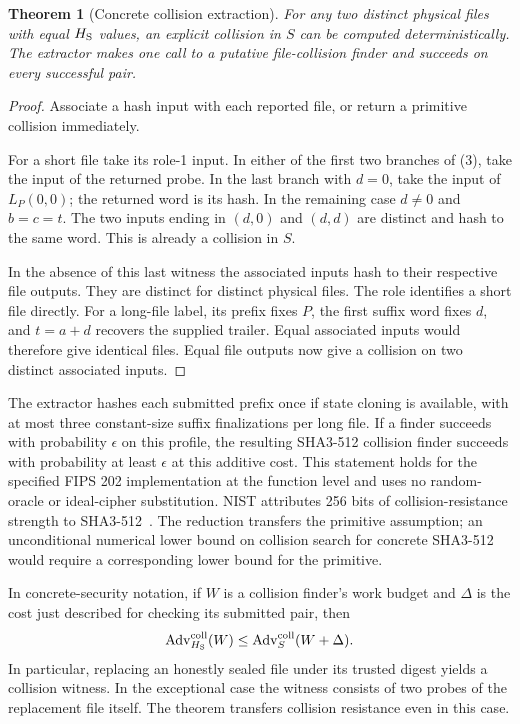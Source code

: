 \documentclass[10pt,twocolumn,letterpaper]{article}
\newtheorem{theorem}{Theorem}
\begin{document}
\begin{theorem}[Concrete collision extraction]\label{th:concrete}
For any two distinct physical files with equal \(H_{\rm S}\) values, an explicit collision in \(S\) can be computed deterministically. The extractor makes one call to a putative file-collision finder and succeeds on every successful pair.
\end{theorem}
\begin{proof}
Associate a hash input with each reported file, or return a primitive collision immediately.

For a short file take its role-1 input. In either of the first two branches of (3), take the input of the returned probe. In the last branch with \(d=0\), take the input of \(L_P(0,0)\); the returned word is its hash. In the remaining case \(d\ne0\) and \(b=c=t\). The two inputs ending in \((d,0)\) and \((d,d)\) are distinct and hash to the same word. This is already a collision in \(S\).

In the absence of this last witness the associated inputs hash to their respective file outputs. They are distinct for distinct physical files. The role identifies a short file directly. For a long-file label, its prefix fixes \(P\), the first suffix word fixes \(d\), and \(t=a+d\) recovers the supplied trailer. Equal associated inputs would therefore give identical files. Equal file outputs now give a collision on two distinct associated inputs.
\end{proof}
The extractor hashes each submitted prefix once if state cloning is available, with at most three constant-size suffix finalizations per long file. If a finder succeeds with probability \(\epsilon\) on this profile, the resulting SHA3-512 collision finder succeeds with probability at least \(\epsilon\) at this additive cost. This statement holds for the specified FIPS 202 implementation at the function level and uses no random-oracle or ideal-cipher substitution. NIST attributes 256 bits of collision-resistance strength to SHA3-512~\cite{strength}. The reduction transfers the primitive assumption; an unconditional numerical lower bound on collision search for concrete SHA3-512 would require a corresponding lower bound for the primitive.

In concrete-security notation, if \(W\) is a collision finder's work budget and \(\Delta\) is the cost just described for checking its submitted pair, then
\[
 \mathrm{Adv}^{\rm coll}_{H_{\rm S}}(W)
       \le \mathrm{Adv}^{\rm coll}_{S}(W+\Delta).
\]
In particular, replacing an honestly sealed file under its trusted digest yields a collision witness. In the exceptional case the witness consists of two probes of the replacement file itself. The theorem transfers collision resistance even in this case.
\end{document}
